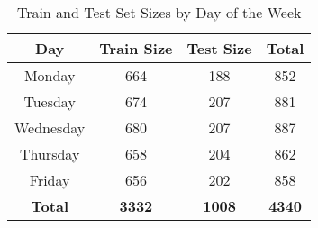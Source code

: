 \begin{table*}[h]
\centering
\caption{Train and Test Set Sizes by Day of the Week}
\label{tab:table1}
\begingroup
\setlength{\tabcolsep}{10pt}
\renewcommand{\arraystretch}{1.1}%
\begin{tabular}{cccc}
    \hline
    \textbf{Day} & \textbf{Train Size} & \textbf{Test Size} & \textbf{Total} \\
    \hline
    Monday    & 664  & 188  & 852  \\
    Tuesday   & 674  & 207  & 881  \\
    Wednesday & 680  & 207  & 887  \\
    Thursday  & 658  & 204  & 862  \\
    Friday    & 656  & 202  & 858  \\
    \hline
    \textbf{Total} & \textbf{3332} & \textbf{1008} & \textbf{4340} \\
    \hline
\end{tabular}
\endgroup
\end{table*}
